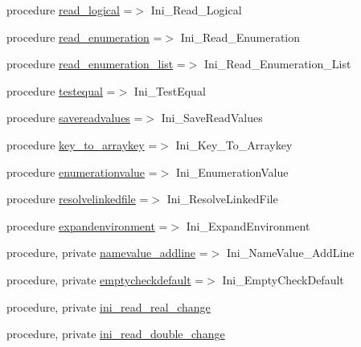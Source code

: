 \begin{DoxyCompactItemize}
\item 
procedure \mbox{\hyperlink{structiniobjects_1_1tinifile_a42a48b2e7a795fd3d1673a5a0116a74d}{read\+\_\+logical}} =$>$ Ini\+\_\+\+Read\+\_\+\+Logical
\item 
procedure \mbox{\hyperlink{structiniobjects_1_1tinifile_a69605f74914f7e47fd1da8902e06c95d}{read\+\_\+enumeration}} =$>$ Ini\+\_\+\+Read\+\_\+\+Enumeration
\item 
procedure \mbox{\hyperlink{structiniobjects_1_1tinifile_a38856a5598bca4de926e393f4c6f3a7e}{read\+\_\+enumeration\+\_\+list}} =$>$ Ini\+\_\+\+Read\+\_\+\+Enumeration\+\_\+\+List
\item 
procedure \mbox{\hyperlink{structiniobjects_1_1tinifile_adee78436589d206238521b7812bb20d8}{testequal}} =$>$ Ini\+\_\+\+Test\+Equal
\item 
procedure \mbox{\hyperlink{structiniobjects_1_1tinifile_ae5adc41f9258840c8fe0fbcf0c4e4a4d}{savereadvalues}} =$>$ Ini\+\_\+\+Save\+Read\+Values
\item 
procedure \mbox{\hyperlink{structiniobjects_1_1tinifile_aad5fde503266682b7e43b32d7bf377da}{key\+\_\+to\+\_\+arraykey}} =$>$ Ini\+\_\+\+Key\+\_\+\+To\+\_\+\+Arraykey
\item 
procedure \mbox{\hyperlink{structiniobjects_1_1tinifile_aa55ff78bb2663d16f4c2038879e5eacd}{enumerationvalue}} =$>$ Ini\+\_\+\+Enumeration\+Value
\item 
procedure \mbox{\hyperlink{structiniobjects_1_1tinifile_addb231c9d7b0011623cba25bd184c0d0}{resolvelinkedfile}} =$>$ Ini\+\_\+\+Resolve\+Linked\+File
\item 
procedure \mbox{\hyperlink{structiniobjects_1_1tinifile_abd394c2d37bb80b8a476413682c45bf4}{expandenvironment}} =$>$ Ini\+\_\+\+Expand\+Environment
\item 
procedure, private \mbox{\hyperlink{structiniobjects_1_1tinifile_ac928bf424a81c71390b42d7b4b989b88}{namevalue\+\_\+addline}} =$>$ Ini\+\_\+\+Name\+Value\+\_\+\+Add\+Line
\item 
procedure, private \mbox{\hyperlink{structiniobjects_1_1tinifile_ae559585bd6c61fe97943a810fa00f522}{emptycheckdefault}} =$>$ Ini\+\_\+\+Empty\+Check\+Default
\item 
procedure, private \mbox{\hyperlink{structiniobjects_1_1tinifile_adc25c3a0240257fbaafcbd9094aa16cc}{ini\+\_\+read\+\_\+real\+\_\+change}}
\item 
procedure, private \mbox{\hyperlink{structiniobjects_1_1tinifile_ab29379ba35db7ae17ccf6dda056f6de1}{ini\+\_\+read\+\_\+double\+\_\+change}}
\item 

\end{DoxyCompactItemize}
